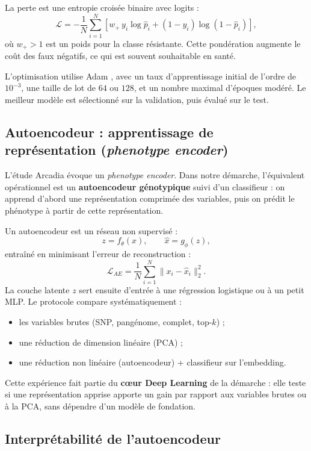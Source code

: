 \documentclass[11pt,a4paper]{article}
\begin{document}
La perte est une entropie croisée binaire avec logits :
\[
\mathcal{L}
=
-\frac{1}{N}\sum_{i=1}^N
\left[
w_+ \, y_i \log \hat p_i
+
(1-y_i)\log(1-\hat p_i)
\right],
\]
où \(w_+ > 1\) est un poids pour la classe résistante. Cette pondération augmente le coût des faux négatifs, ce qui est souvent souhaitable en santé.

L'optimisation utilise Adam \citep{kingma2015}, avec un taux d'apprentissage initial de l'ordre de \(10^{-3}\), une taille de lot de $64$ ou $128$, et un nombre maximal d'époques modéré. Le meilleur modèle est sélectionné sur la validation, puis évalué sur le test.

\subsection{Autoencodeur : apprentissage de représentation (\emph{phenotype encoder})}

L'étude Arcadia évoque un \emph{phenotype encoder}. Dans notre démarche, l'équivalent opérationnel est un \textbf{autoencodeur génotypique} suivi d'un classifieur : on apprend d'abord une représentation comprimée des variables, puis on prédit le phénotype à partir de cette représentation.

Un autoencodeur est un réseau non supervisé :
\[
z = f_\theta(x), \qquad \hat x = g_\phi(z),
\]
entraîné en minimisant l'erreur de reconstruction :
\[
\mathcal{L}_{AE}
=
\frac{1}{N}\sum_{i=1}^N
\|x_i - \hat x_i\|_2^2.
\]
La couche latente \(z\) sert ensuite d'entrée à une régression logistique ou à un petit MLP. Le protocole compare systématiquement :
\begin{itemize}[leftmargin=1.2em]
    \item les variables brutes (SNP, pangénome, complet, top-$k$) ;
    \item une réduction de dimension linéaire (PCA) ;
    \item une réduction non linéaire (autoencodeur) + classifieur sur l'embedding.
\end{itemize}

Cette expérience fait partie du \textbf{cœur Deep Learning} de la démarche : elle teste si une représentation apprise apporte un gain par rapport aux variables brutes ou à la PCA, sans dépendre d'un modèle de fondation.

\subsection{Interprétabilité de l'autoencodeur}
\label{sec:ae_interpretabilite}
\end{document}

